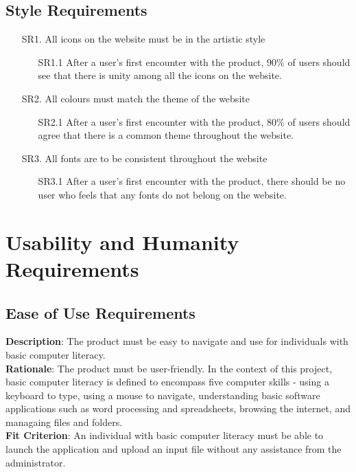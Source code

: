 \documentclass[12pt]{article}
\begin{document}
\subsection{Style Requirements}
\begin{itemize}
  \item [SR1.] All icons on the website must be in the artistic style
  \begin{itemize}
    \item [SR1.1] After a user's first encounter with the product, 90\% of users should
    see that there is unity among all the icons on the website. 
  \end{itemize}
  \item [SR2.] All colours must match the theme of the website
  \begin{itemize}
    \item [SR2.1] After a user's first encounter with the product, 80\% of users
    should agree that there is a common theme throughout the website.
  \end{itemize}
  \item [SR3.] All fonts are to be consistent throughout the website 
  \begin{itemize}
    \item [SR3.1] After a user's first encounter with the product, there should
    be no user who feels that any fonts do not belong on the website. 
  \end{itemize}
\end{itemize}

\section{Usability and Humanity Requirements}
\subsection{Ease of Use Requirements}
\textbf{Description}: The product must be easy to navigate and use for individuals with basic computer literacy.\\
\textbf{Rationale}: The product must be user-friendly. In the context of this project, basic computer literacy is defined to encompass five computer skills - using a keyboard
to type, using a mouse to navigate, understanding basic software applications such as word processing and spreadsheets, browsing the internet, and managaing files and folders.\\ 
\textbf{Fit Criterion}: An individual with basic computer literacy must be able to launch the application and upload an input file without any assistance from the administrator.
\end{document}
